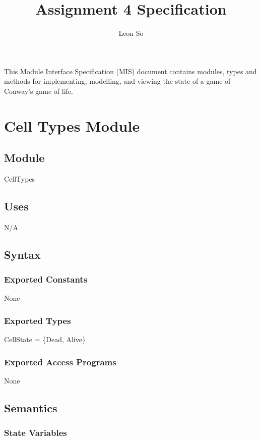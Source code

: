 \documentclass[12pt]{article}
\title{Assignment 4 Specification}
\author{Leon So}
\begin{document}
\maketitle
This Module Interface Specification (MIS) document contains modules, types and
methods for implementing, modelling, and viewing the state of a game of Conway's game of life.

\newpage

\section* {Cell Types Module}

\subsection*{Module}

CellTypes

\subsection* {Uses}

N/A

\subsection* {Syntax}

\subsubsection* {Exported Constants}
None

\subsubsection* {Exported Types}

CellState = \{Dead, Alive\}

\subsubsection* {Exported Access Programs}

None

\subsection* {Semantics}

\subsubsection* {State Variables}
\end{document}

